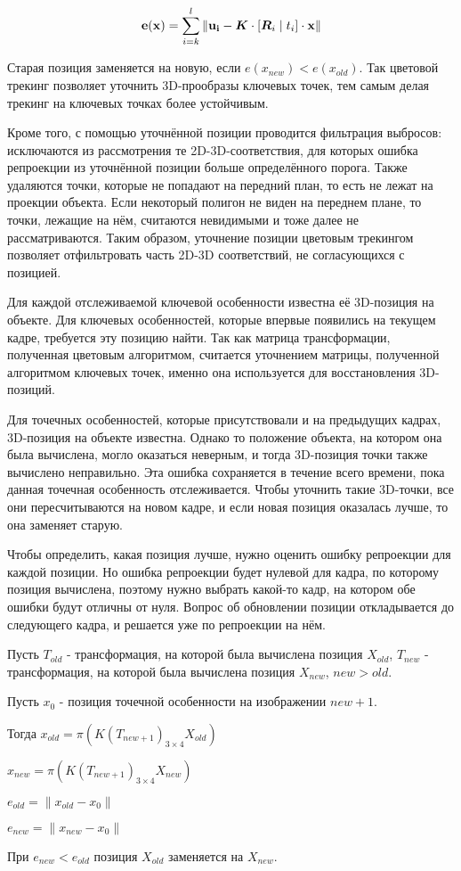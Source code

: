 \begin{equation}
\label{eqn:sum_reproj}
\mathbf{e}(\mathbf{x}) = \sum\limits_{i = k}^l \| \mathbf{u_i} - \bm{K} \cdot
[\bm{R}_i \mid \mathnormal{t}_i] \cdot \mathbf{x} \|
\end{equation}

Старая позиция заменяется на новую, если $e(x_{new}) < e(x_{old})$.
Так цветовой трекинг позволяет уточнить 3D-прообразы ключевых точек, тем самым
делая трекинг на ключевых точках более устойчивым.

Кроме того, с помощью уточнённой позиции проводится фильтрация выбросов:
исключаются из рассмотрения те 2D-3D-соответствия, для которых ошибка
репроекции из уточнённой позиции больше определённого порога.
Также удаляются точки, которые не попадают на передний план, то есть не лежат
на проекции объекта.
Если некоторый полигон не виден на переднем плане, то точки, лежащие на нём,
считаются невидимыми и тоже далее не рассматриваются.
Таким образом, уточнение позиции цветовым трекингом позволяет отфильтровать
часть 2D-3D соответствий, не согласующихся с позицией.


Для каждой отслеживаемой ключевой особенности известна её 3D-позиция на
объекте.
Для ключевых особенностей, которые впервые появились на текущем кадре,
требуется эту позицию найти.
Так как матрица трансформации, полученная цветовым алгоритмом, считается
уточнением матрицы, полученной алгоритмом ключевых точек, именно она
используется для восстановления 3D-позиций.


Для точечных особенностей, которые присутствовали и на предыдущих кадрах,
3D-позиция на объекте известна.
Однако то положение объекта, на котором она была вычислена, могло оказаться
неверным, и тогда 3D-позиция точки также вычислено неправильно.
Эта ошибка сохраняется в течение всего времени, пока данная точечная
особенность отслеживается.
Чтобы уточнить такие 3D-точки, все они пересчитываются на новом кадре, и если
новая позиция оказалась лучше, то она заменяет старую.

Чтобы определить, какая позиция лучше, нужно оценить ошибку репроекции для
каждой позиции.
Но ошибка репроекции будет нулевой для кадра, по которому позиция вычислена,
поэтому нужно выбрать какой-то кадр, на котором обе ошибки будут отличны от
нуля.
Вопрос об обновлении позиции откладывается до следующего кадра, и решается уже
по репроекции на нём.

Пусть $T_{old}$ - трансформация, на которой была вычислена позиция $X_{old}$,
$T_{new}$ - трансформация, на которой была вычислена позиция
$X_{new}$, $new > old$.

Пусть $x_0$ - позиция точечной особенности на изображении $new + 1$. 

Тогда $x_{old} = \pi (K (T_{new + 1})_{3 \times 4} X_{old})$

$x_{new} = \pi (K (T_{new + 1})_{3 \times 4} X_{new})$

$e_{old} = \| x_{old} - x_0 \|$

$e_{new} = \| x_{new} - x_0 \|$

При $e_{new} < e_{old}$ позиция $X_{old}$ заменяется на $X_{new}$.
